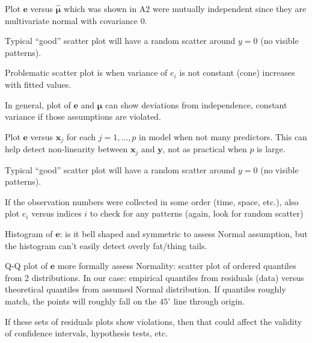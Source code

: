 Plot $ \symbf{e} $ versus $ \hat{\symbf{\mu}} $ which
was shown in A2 were mutually independent
since they are multivariate normal with covariance 0.

Typical ``good'' scatter plot will have a random scatter
around $ y=0 $ (no visible patterns).

Problematic scatter plot is when
variance of $ e_i $ is not constant (cone)
increases with fitted values.

In general, plot of $ \symbf{e} $ and $ \hat{\symbf{\mu}} $
can show deviations from independence, constant variance if those
assumptions are violated.

Plot $ \symbf{e} $ versus $ \symbf{x}_j $ for each $ j=1,\ldots,p $
in model when not many predictors. This can help detect non-linearity
between $ \symbf{x}_j $ and $ \symbf{y} $, not as practical when
$ p $ is large.

Typical ``good'' scatter plot will have a random scatter
around $ y=0 $ (no visible patterns).

If the observation numbers were collected in some order
(time, space, etc.), also plot $ e_i $ versus indices
$ i $ to check for any patterns (again, look for random scatter)

Histogram of $ \symbf{e} $: is it bell shaped and symmetric
to assess Normal assumption, but the histogram can't easily
detect overly fat/thing tails.

Q-Q plot of $ \symbf{e} $ more formally assess Normality:
scatter plot of ordered quantiles from 2 distributions.
In our case: empirical quantiles from residuals (data)
versus theoretical quantiles from assumed Normal distribution.
If quantiles roughly match, the points will roughly fall
on the $ 45^\circ $ line through origin.

If these sets of residuals plots show violations, then that could
affect the validity of confidence intervals, hypothesis tests, etc.
